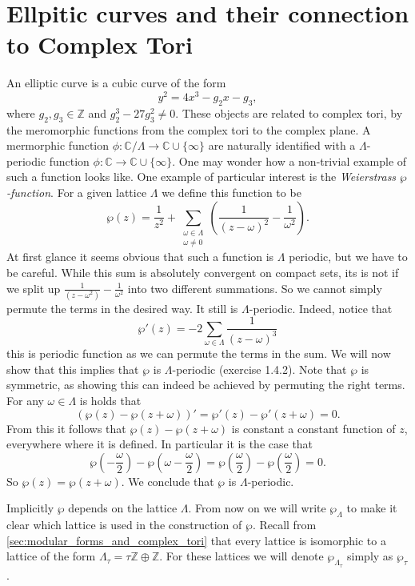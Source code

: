 \documentclass[a4paper]{article}
\theoremstyle{theoremdd}
\theoremstyle{definitiondd}
\theoremstyle{remarkdd}
\newcommand{\Z}{\mathbb{Z}}
\newcommand{\C}{\mathbb{C}}
\begin{document}
\section{Ellpitic curves and their connection to Complex Tori}
An elliptic curve is a cubic curve of the form \[
y^2 = 4x^3 - g_2x - g_3
,\] 
where $g_2, g_3 \in \Z$ and $g_2^3 - 27 g_3^2 \ne 0$. 
These objects are related to complex tori, by the meromorphic functions from the complex tori to the complex plane. 
A mermorphic function $\phi: \C / \Lambda \to \C \cup \{\infty\} $ are naturally identified with a  $\Lambda$-periodic function $\phi: \C \to \C \cup \{\infty\}$.
One may wonder how a non-trivial example of such a function looks like. 
One example of particular interest is the \emph{Weierstrass $\wp$-function}. 
For a given lattice  $\Lambda$ we define this function to be \[
	\wp(z) = \frac{1}{z^2} + \sum_{\substack{\omega \in \Lambda \\ \omega \ne 0}}\left( \frac{1}{(z-\omega)^2} - \frac{1}{\omega^2} \right) 
.\] 
At first glance it seems obvious that such a function is $\Lambda$ periodic, but we have to be careful. 
While this sum is absolutely convergent on compact sets, its is not if we split up $\frac{1}{(z-\omega^2)} - \frac{1}{\omega^2}$ into two different summations. So we cannot simply permute the terms in the desired way. 
It still is $\Lambda$-periodic. Indeed, notice that  \[
	\wp'(z) = -2 \sum_{\omega \in \Lambda} \frac{1}{(z - \omega)^3}
\] 
this is periodic function as we can permute the terms in the sum.
We will now show that this implies that $\wp$ is $\Lambda$-periodic (exercise 1.4.2).
Note that $\wp$ is symmetric, as showing this can indeed be achieved by permuting the right terms.
For any $\omega \in \Lambda$ is holds that 
\[
	(\wp(z) - \wp(z + \omega))' = \wp'(z) - \wp'(z+ \omega) = 0 
.\] 
From this it follows that $\wp(z) - \wp(z + \omega)$ is constant a constant function of $z$, everywhere where it is defined.
In particular it is the case that \[
	\wp\left(-\frac{\omega}{2}\right) - \wp\left(\omega - \frac{\omega}{2}\right) = \wp\left(\frac{\omega}{2}\right) - \wp\left(\frac{\omega}{2}\right)  = 0 
.\] 
So $\wp(z) = \wp(z+ \omega)$. 
We conclude that $\wp$ is $\Lambda$-periodic.

Implicitly $\wp$ depends on the lattice $\Lambda$. 
From now on we will write  $\wp_\Lambda$ to make it clear which lattice is used in the construction of $\wp$. 
Recall from \cref{sec:modular_forms_and_complex_tori} that every lattice is isomorphic to a lattice of the form $\Lambda_\tau = \tau\Z \oplus \Z$. For these lattices we will denote $\wp_{\Lambda_\tau}$ simply as $\wp_\tau$.
\end{document}
